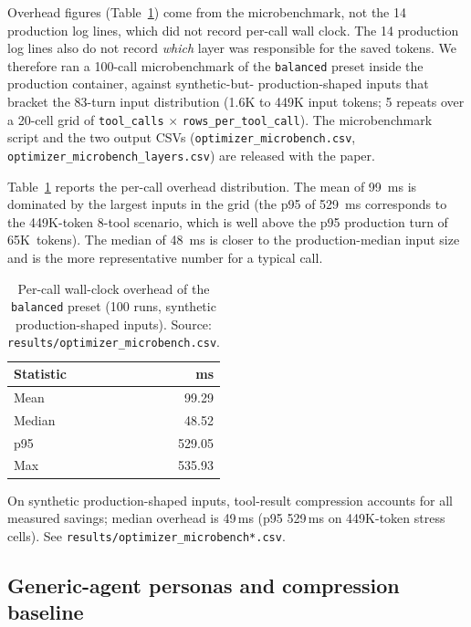 \documentclass{article}
\newcommand{\code}[1]{\texttt{\small #1}}
\begin{document}
Overhead figures (Table~\ref{tab:prod-overhead}) come from the
microbenchmark, not the 14 production log lines, which did not record
per-call wall clock. The 14 production log lines also do not record
\emph{which} layer was responsible for the saved tokens.
We therefore ran a 100-call microbenchmark of the \code{balanced}
preset inside the production container, against synthetic-but-
production-shaped inputs that bracket the 83-turn input distribution
(1.6K to 449K input tokens; 5 repeats over a 20-cell grid of
\code{tool\_calls} $\times$ \code{rows\_per\_tool\_call}). The
microbenchmark script and the two output CSVs
(\code{optimizer\_microbench.csv}, \code{optimizer\_microbench\_layers.csv})
are released with the paper.

Table~\ref{tab:prod-overhead} reports the per-call overhead
distribution. The mean of 99~ms is dominated by the largest inputs in
the grid (the p95 of 529~ms corresponds to the 449K-token 8-tool
scenario, which is well above the p95 production turn of 65K~tokens).
The median of 48~ms is closer to the production-median input size and
is the more representative number for a typical call.

\begin{table}[h]
  \caption{Per-call wall-clock overhead of the \code{balanced} preset
  (100 runs, synthetic production-shaped inputs).
  Source: \code{results/optimizer\_microbench.csv}.}
  \label{tab:prod-overhead}
  \centering
  \small
  \begin{tabular}{lr}
    \toprule
    Statistic & ms \\
    \midrule
    Mean              &  99.29 \\
    Median            &  48.52 \\
    p95               & 529.05 \\
    Max               & 535.93 \\
    \bottomrule
  \end{tabular}
\end{table}

On synthetic production-shaped inputs, tool-result compression accounts
for all measured savings; median overhead is 49\,ms (p95 529\,ms on
449K-token stress cells). See \code{results/optimizer\_microbench*.csv}.

\subsection{Generic-agent personas and compression baseline}
\label{sec:personas}
\end{document}
